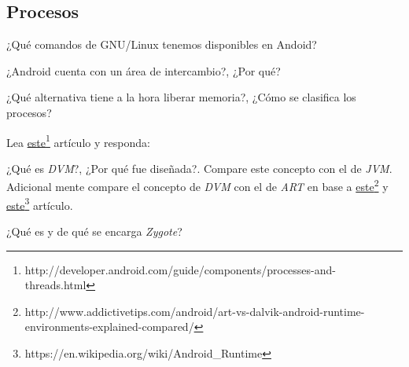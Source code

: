 \subsection{Procesos}
\begin{questions}
  \question ¿Qué comandos de GNU/Linux tenemos disponibles en Andoid?
  
  \question ¿Android cuenta con un área de intercambio?, ¿Por qué?
  
  \question ¿Qué alternativa tiene a la hora liberar memoria?, ¿Cómo se clasifica los procesos?
  
  \question Lea \href{http://developer.android.com/guide/components/processes-and-threads.html}{este}\footnote{http://developer.android.com/guide/components/processes-and-threads.html} artículo y responda:

  \question ¿Qué es \textit{DVM}?, ¿Por qué fue diseñada?. Compare este concepto con el de \textit{JVM}. Adicional mente compare el concepto de \textit{DVM} con el de \textit{ART} en base a \href{http://www.addictivetips.com/android/art-vs-dalvik-android-runtime-environments-explained-compared/}{este}\footnote{http://www.addictivetips.com/android/art-vs-dalvik-android-runtime-environments-explained-compared/} y \href{https://en.wikipedia.org/wiki/Android\_Runtime}{este}\footnote{https://en.wikipedia.org/wiki/Android\_Runtime} artículo.

  \question ¿Qué es y de qué se encarga \textit{Zygote}?
\end{questions}

